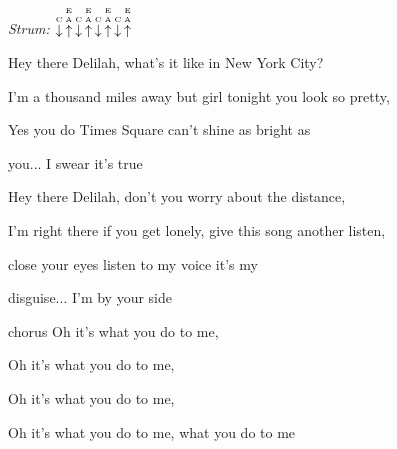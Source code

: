 \begin{song}


 \quad
\textit{Strum:} $\PluckDown{C}\PluckUp{E A}\PluckDown{C}\PluckUp{E A}\PluckDown{C}\PluckUp{E A}\PluckDown{C}\PluckUp{E A}$

\large

\begin{chordbox}
\par
{}\par
{}\par
{}\par
{}\par
\end{chordbox}

\large

\bigskip

     \par

\bigskip

 Hey there Delilah, what's it like in New York City? \par
I'm a thousand miles away but girl tonight you look so pretty, \par
Yes you do  Times Square can't shine as bright as \par
{}you... I swear it's true \par

\bigskip

 Hey there Delilah, don't you worry about the distance, \par
I'm right there if you get lonely, give this song another listen, \par
close your eyes listen to my voice it's my \par
disguise... I'm by your side \par

\bigskip

\begin{chorusbox}{chorus}
Oh it's what you do to me, \par
{}Oh it's what you do to me, \par
{}Oh it's what you do to me, \par
{}Oh it's what you do to me, what you  do to me \par
\end{chorusbox}


\end{song}
